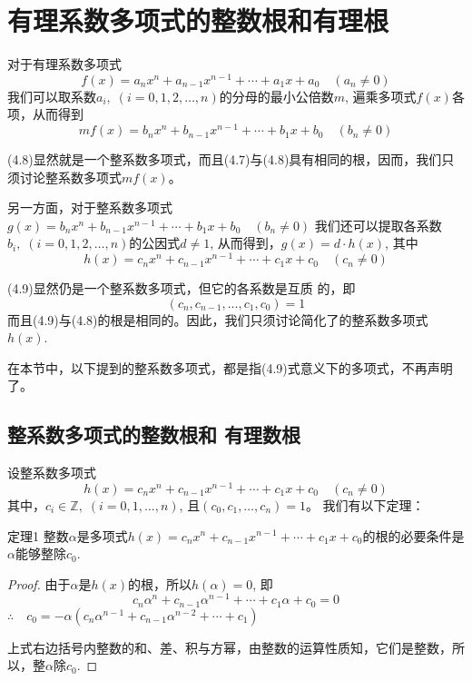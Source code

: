 \section{有理系数多项式的整数根和有理根}
对于有理系数多项式
\begin{equation}
    f(x)=a_nx^n+a_{n-1}x^{n-1}+\cdots+a_1x+a_0\quad (a_n\ne 0)
\end{equation}
我们可以取系数$a_i,\; (i=0, 1, 2,\ldots,n)$的分母的最小公倍数$m$, 遍乘多项式$f(x)$各项，从而得到
\begin{equation}
    mf(x)=b_nx^n+b_{n-1}x^{n-1}+\cdots+b_1x+b_0\quad (b_n\ne 0)
\end{equation}

(4.8)显然就是一个整系数多项式，而且(4.7)与(4.8)具有相同的根，因而，我们只须讨论整系数多项式$mf(x)$。

另一方面，对于整系数多项式$g (x) =b_nx^n+b_{n-1}x^{n-1}+\cdots+b_1x+b_0\quad (b_n\ne 0)$
我们还可以提取各系数$b_i,\; (i=0, 1, 2,\ldots,n)$的公因式$d\ne 1$, 从而得到，$g(x)=d\cdot h(x)$, 其中
\begin{equation}
    h (x) =c_nx^n+c_{n-1}x^{n-1}+\cdots+c_1x+c_0\quad (c_n\ne 0)
\end{equation}

(4.9)显然仍是一个整系数多项式，但它的各系数是互质
的，即$$(c_n,c_{n-1},\ldots,c_1,c_0)=1$$ 而且(4.9)与(4.8)的根是相同的。因此，我们只须讨论简化了的整系数多项式$h(x)$.

在本节中，以下提到的整系数多项式，都是指(4.9)式意义下的多项式，不再声明了。

\subsection{整系数多项式的整数根和 有理数根}

设整系数多项式
\[ h (x) =c_nx^n+c_{n-1}x^{n-1}+\cdots+c_1x+c_0\quad (c_n\ne 0)\]
其中，$c_i\in\mathbb{Z}, \;(i=0, 1,\ldots,n)$, 且$(c_0,c_1,\ldots,c_n)=1$。
我们有以下定理：

\begin{blk}{定理1}
    整数$\alpha$是多项式$h (x) =c_nx^n+c_{n-1}x^{n-1}+\cdots+c_1x+c_0$的根的必要条件是$\alpha$能够整除$c_0$.
\end{blk}

\begin{proof}
    由于$\alpha$是$h(x)$的根，所以$h(\alpha)=0$, 即
\[c_n\alpha^n+c_{n-1}\alpha^{n-1}+\cdots+c_1\alpha+c_0=0\]
$\therefore\quad c_0=-\alpha\left(c_n\alpha^{n-1}+c_{n-1}\alpha^{n-2}+\cdots+c_1\right)$

上式右边括号内整数的和、差、积与方幂，由整数的运算性质知，它们是整数，所以，整$\alpha$除$c_0$.
\end{proof}


